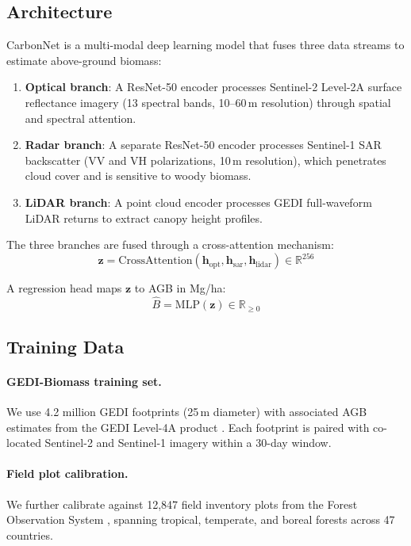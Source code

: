 \documentclass[11pt,a4paper]{article}
\newcommand{\R}{\mathbb{R}}
\begin{document}
\subsection{Architecture}

CarbonNet is a multi-modal deep learning model that fuses three data
streams to estimate above-ground biomass:

\begin{enumerate}
  \item \textbf{Optical branch}: A ResNet-50 encoder processes
    Sentinel-2 Level-2A surface reflectance imagery (13 spectral bands,
    10--60\,m resolution) through spatial and spectral attention.
  \item \textbf{Radar branch}: A separate ResNet-50 encoder processes
    Sentinel-1 SAR backscatter (VV and VH polarizations, 10\,m
    resolution), which penetrates cloud cover and is sensitive to
    woody biomass.
  \item \textbf{LiDAR branch}: A point cloud encoder processes GEDI
    full-waveform LiDAR returns to extract canopy height profiles.
\end{enumerate}

The three branches are fused through a cross-attention mechanism:
\begin{equation}
  \mathbf{z} = \text{CrossAttention}(\mathbf{h}_{\text{opt}},
  \mathbf{h}_{\text{sar}}, \mathbf{h}_{\text{lidar}}) \in \R^{256}
\end{equation}

A regression head maps $\mathbf{z}$ to AGB in Mg/ha:
\begin{equation}
  \hat{B} = \text{MLP}(\mathbf{z}) \in \R_{\geq 0}
\end{equation}

\subsection{Training Data}

\paragraph{GEDI-Biomass training set.} We use 4.2 million GEDI
footprints (25\,m diameter) with associated AGB estimates from the GEDI
Level-4A product \citep{dubayah2022gedi}. Each footprint is paired with
co-located Sentinel-2 and Sentinel-1 imagery within a 30-day window.

\paragraph{Field plot calibration.} We further calibrate against 12{,}847
field inventory plots from the Forest Observation System
\citep{schepaschenko2019forest}, spanning tropical, temperate, and boreal
forests across 47 countries.
\end{document}
